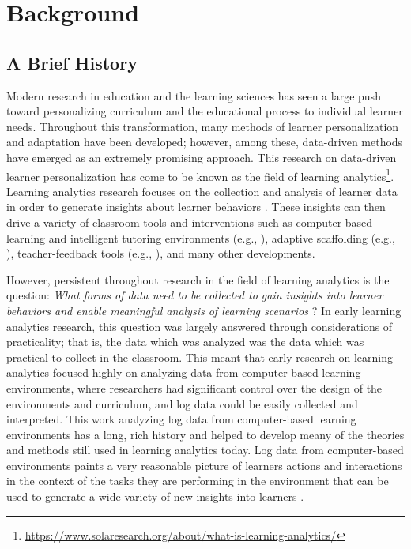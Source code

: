 \documentclass[manuscript,screen,review]{acmart}
\begin{document}

\section{Background} \label{sec:background}

\subsection{A Brief History}

Modern research in education and the learning sciences has seen a large push toward personalizing curriculum and the educational process to individual learner needs. Throughout this transformation, many methods of learner personalization and adaptation have been developed; however, among these, data-driven methods have emerged as an extremely promising approach. This research on data-driven learner personalization has come to be known as the field of learning analytics\footnote{\href{https://www.solaresearch.org/about/what-is-learning-analytics/}{https://www.solaresearch.org/about/what-is-learning-analytics/}}. Learning analytics research focuses on the collection and analysis of learner data in order to generate insights about learner behaviors \cite{maseleno2018demystifying, Zilvinskis2017}. These insights can then drive a variety of classroom tools and interventions such as computer-based learning and intelligent tutoring environments (e.g., \cite{heffernan2014assistments, leelawong2008designing}), adaptive scaffolding (e.g., \cite{Emerson2020, basu2017learner}), teacher-feedback tools (e.g., \cite{rodriguez2018teacher, Hutchins2023}), and many other developments. 

However, persistent throughout research in the field of learning analytics is the question: \textit{What forms of data need to be collected to gain insights into learner behaviors and enable meaningful analysis of learning scenarios} \cite{vatral2022using, ochoa2017multimodal}? In early learning analytics research, this question was largely answered through considerations of practicality; that is, the data which was analyzed was the data which was practical to collect in the classroom. This meant that early research on learning analytics focused highly on analyzing data from computer-based learning environments, where researchers had significant control over the design of the environments and curriculum, and log data could be easily collected and interpreted. This work analyzing log data from computer-based learning environments has a long, rich history and helped to develop meany of the theories and methods still used in learning analytics today. Log data from computer-based environments paints a very reasonable picture of learners actions and interactions in the context of the tasks they are performing in the environment that can be used to generate a wide variety of new insights into learners \cite{hoppe2017computational, ochoa2017multimodal}. 
\end{document}
